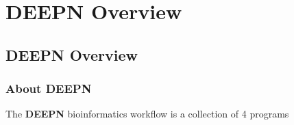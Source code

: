 \documentclass[11pt,fleqn]{book} %
\newcommand{\DEEPN}{\textbf{DEEPN }}
\begin{document}

\pagestyle{empty} %

\tableofcontents %

\cleardoublepage %

\pagestyle{fancy} %


\part{DEEPN Overview}



\chapter{DEEPN Overview}

\section{About DEEPN}
The \DEEPN bioinformatics workflow is a collection of 4 programs
\end{document}
